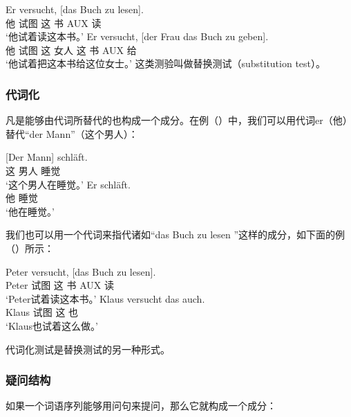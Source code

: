 \eal
\ex\label{ex-das-buch-zu-lesen} 
\gll Er versucht, [das Buch zu lesen].\\
	他 试图 \spacebr{}这 书 AUX 读\\
\glt `他试着读这本书。'
\ex 
\gll Er versucht, [der Frau das Buch zu geben].\\
	 他 试图 \spacebr{}这 女人 这 书 AUX 给\\
\glt `他试着把这本书给这位女士。'
\zl
%
这类测验叫做替换测试（substitution test）。

\subsubsection{代词化}
凡是能够由代词所替代的也构成一个成分。在例（）中，我们可以用代词er（他）替代“der Mann”（这个男人）：

\eal
\ex 
\gll {}[Der Mann] schläft.\\
	 {}\spacebr{}这 男人 睡觉\\
\glt `这个男人在睡觉。'
\ex 
\gll Er schläft.\\
	 他 睡觉\\
\glt `他在睡觉。'
\zl

\noindent
我们也可以用一个代词来指代诸如“das Buch zu lesen ”这样的成分，如下面的例（）所示：

\eal
\ex 
\gll Peter versucht, [das Buch zu lesen].\\
	 Peter 试图 \spacebr{}这 书 AUX 读\\
\glt `Peter试着读这本书。'
\ex 
\gll Klaus versucht das auch.\\
	 Klaus 试图 这 也\\
\glt `Klaus也试着这么做。'
\zl

\noindent
代词化测试是替换测试的另一种形式。

\subsubsection{疑问结构}
如果一个词语序列能够用问句来提问，那么它就构成一个成分：

